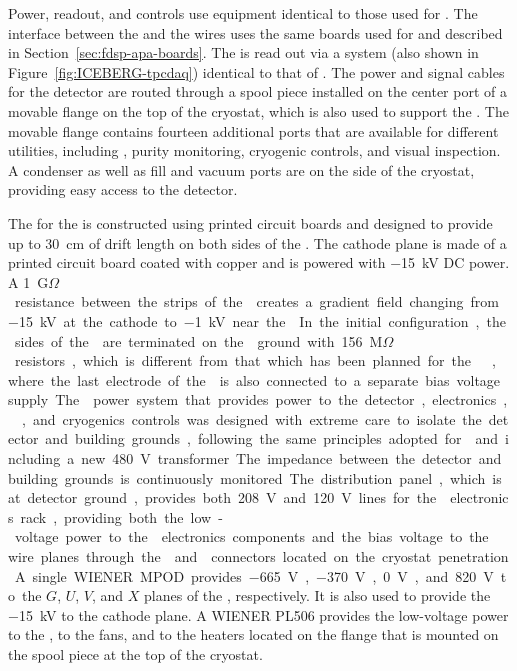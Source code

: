 Power, readout, and controls use equipment identical to those used for . The
interface between the  and the  wires uses the same  boards
used for  and described in Section~\ref{sec:fdsp-apa-boards}. The  is
read out via a  system (also shown in Figure~\ref{fig:ICEBERG-tpcdaq})
identical to that of . The power and signal cables for the detector 
are routed through a spool piece installed on the center port of a movable flange on the 
top of the cryostat, which is also used to support the . The movable 
flange contains fourteen additional ports that are available for different utilities, 
including , purity monitoring, cryogenic controls, and visual inspection. 
A condenser as well as  fill and vacuum ports are on the side of the cryostat, 
providing easy access to the detector.

The  for the  is constructed using printed circuit boards and 
designed to provide  up to \SI{30}{cm} of drift length on both sides of the . The cathode 
plane is made of a printed circuit board coated with copper and is powered with 
\SI{-15}{kV} DC power. A \SI{1}{G$\Omega$} resistance between the strips of the 
creates a gradient field changing from \SI{-15}{kV} at the cathode to \SI{-1}{kV} near the 
. In the initial configuration, the sides of the  are terminated on the 
ground with \SI{156}{M$\Omega$} resistors, which is different from that which has been
planned for the  , where the last electrode of the  is also connected to
a separate bias voltage supply. 

The  power system that provides power to the detector, electronics, 
, and cryogenics controls was designed with extreme care to 
isolate the detector and building grounds, following the same principles adopted
for  and including a new \SI{480}{V} transformer. The impedance between the detector
and building grounds is continuously monitored. The distribution panel, which is 
at detector ground, provides both \SI{208}{V} and \SI{120}{V} lines for the  electronics rack, 
providing both the low-voltage power to the  electronics components and the bias 
voltage to the  wire planes through the  and 
connectors located on the cryostat penetration. A single WIENER MPOD provides 
\SI{-665}{V}, \SI{-370}{V}, \SI{0}{V}, and \SI{820}{V} to the $G$, $U$, $V$, and 
$X$ planes of the , respectively. It is also used to provide the 
\SI{-15}{kV} to the cathode plane. A WIENER PL506 provides the low-voltage
power to the , to the fans, and to the heaters located on the 
flange that is mounted on the spool piece at the top of the cryostat. 

